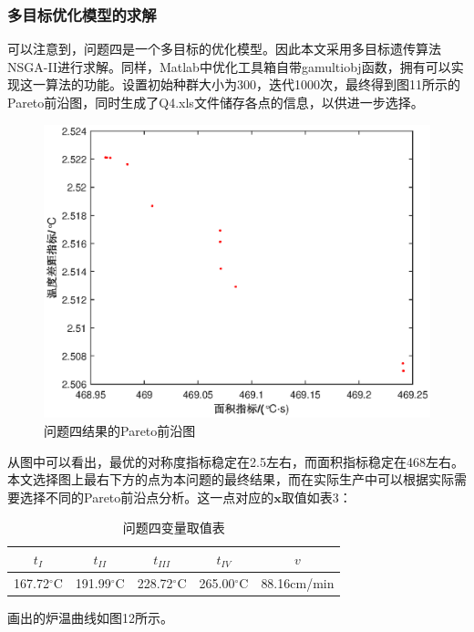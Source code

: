 \documentclass[a4paper,12pt]{ctexart} %
\begin{document}
	\subsubsection{多目标优化模型的求解}
	可以注意到，问题四是一个多目标的优化模型。因此本文采用多目标遗传算法NSGA-II进行求解。同样，Matlab中优化工具箱自带gamultiobj函数，拥有可以实现这一算法的功能。设置初始种群大小为300，迭代1000次，最终得到图11所示的Pareto前沿图，同时生成了Q4.xls文件储存各点的信息，以供进一步选择。
	\begin{figure}[H]
		\centering
		\includegraphics[scale=0.6]{Q4pareto}
		\caption{问题四结果的Pareto前沿图}
	\end{figure}\par
	从图中可以看出，最优的对称度指标稳定在2.5左右，而面积指标稳定在468左右。本文选择图上最右下方的点为本问题的最终结果，而在实际生产中可以根据实际需要选择不同的Pareto前沿点分析。这一点对应的$\boldsymbol{x}$取值如表3：\par\par
	\begin{table}[h]
		\centering
		\caption{问题四变量取值表}
		\begin{tabular}{ccccc}
		\toprule
		$t_{I}$ & $t_{II}$ & $t_{III}$ & $t_{IV}$ & $v$\\ \midrule
		167.72$^\circ$C & 191.99$^\circ$C & 228.72$^\circ$C & 265.00$^\circ$C & 88.16cm/min\\
		\bottomrule 
		\end{tabular}
		\label{t2}
	\end{table}\par
	画出的炉温曲线如图12所示。
\end{document}
